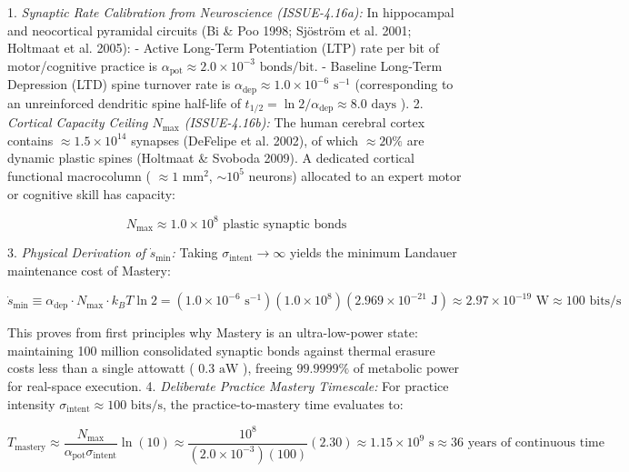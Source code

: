 \documentclass[11pt,a4paper]{article}
\theoremstyle{definition}
\theoremstyle{remark}
\begin{document}
1. \textit{Synaptic Rate Calibration from Neuroscience (ISSUE-4.16a):} In hippocampal and neocortical pyramidal circuits (Bi \& Poo 1998; Sjöström et al. 2001; Holtmaat et al. 2005):
- Active Long-Term Potentiation (LTP) rate per bit of motor/cognitive practice is $\alpha_{\text{pot}} \approx 2.0 \times 10^{-3}\text{ bonds/bit}$.
- Baseline Long-Term Depression (LTD) spine turnover rate is $\alpha_{\text{dep}} \approx 1.0 \times 10^{-6}\text{ s}^{-1}$ (corresponding to an unreinforced dendritic spine half-life of $t_{1/2} = \ln 2 / \alpha_{\text{dep}} \approx 8.0\text{ days}$ ).
2. \textit{Cortical Capacity Ceiling $N_{\max}$ (ISSUE-4.16b):} The human cerebral cortex contains $\approx 1.5 \times 10^{14}$ synapses (DeFelipe et al. 2002), of which $\approx 20\%$ are dynamic plastic spines (Holtmaat \& Svoboda 2009). A dedicated cortical functional macrocolumn ( $\approx 1\text{ mm}^2$, $\sim 10^5$ neurons) allocated to an expert motor or cognitive skill has capacity:


\begin{equation}
N_{\max} \approx 1.0 \times 10^8\text{ plastic synaptic bonds}
\end{equation}


3. \textit{Physical Derivation of $\dot{s}_{\min}$:} Taking $\sigma_{\text{intent}} \to \infty$ yields the minimum Landauer maintenance cost of Mastery:


\begin{equation}
\boxed{\dot{s}_{\min} \equiv \alpha_{\text{dep}} \cdot N_{\max} \cdot k_B T \ln 2 = (1.0 \times 10^{-6}\text{ s}^{-1})(1.0 \times 10^8)(2.969 \times 10^{-21}\text{ J}) \approx 2.97 \times 10^{-19}\text{ W} \approx 100\text{ bits/s}}
\end{equation}


This proves from first principles why Mastery is an ultra-low-power state: maintaining 100 million consolidated synaptic bonds against thermal erasure costs less than a single attowatt ( $0.3\text{ aW}$ ), freeing $99.9999\%$ of metabolic power for real-space execution.
4. \textit{Deliberate Practice Mastery Timescale:} For practice intensity $\sigma_{\text{intent}} \approx 100\text{ bits/s}$, the practice-to-mastery time evaluates to:


\begin{equation}
T_{\text{mastery}} \approx \frac{N_{\max}}{\alpha_{\text{pot}} \sigma_{\text{intent}}} \ln(10) \approx \frac{10^8}{(2.0 \times 10^{-3})(100)}(2.30) \approx 1.15 \times 10^9\text{ s} \approx 36\text{ years of continuous time}
\end{equation}
\end{document}
